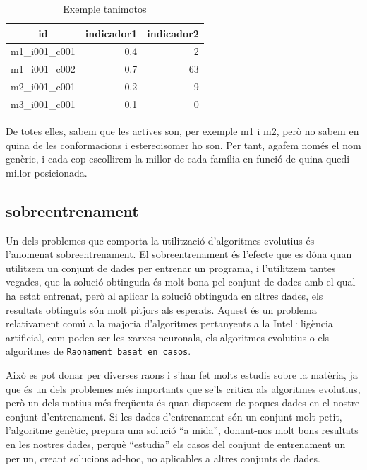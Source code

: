 \begin{table}
\centering
\begin{tabular}{|l|r|r|}
\hline
\multicolumn{1}{|c|}{\textbf{id }} & \multicolumn{1}{c|}{\textbf{ indicador1 }} & \multicolumn{1}{c|}{\textbf{ indicador2}} \\
\hline
\hline
m1\_i001\_c001 & 0.4 & 2  \\
m1\_i001\_c002 & 0.7 & 63 \\
m2\_i001\_c001 & 0.2 & 9  \\
m3\_i001\_c001 & 0.1 & 0  \\
\hline
\end{tabular}
\caption{Exemple tanimotos}
\end{table}

De totes elles, sabem que les actives son, per exemple m1 i m2, però no sabem
en quina de les conformacions i estereoisomer ho son.  Per tant, agafem només el
nom genèric, i cada cop escollirem la millor de cada família en funció de quina
quedi millor posicionada.



\subsection{sobreentrenament} %
\label{sub:sobreentrenament}

Un dels problemes que comporta la utilització d'algoritmes evolutius és
l'anomenat sobreentrenament.  El sobreentrenament és l'efecte que es dóna quan
utilitzem un conjunt de dades per entrenar un programa, i l'utilitzem tantes
vegades, que la solució obtinguda és molt bona pel conjunt de dades amb el qual
ha estat entrenat, però al aplicar la solució obtinguda en altres dades, els
resultats obtinguts són molt pitjors als esperats.  Aquest és un problema
relativament comú a la majoria d'algoritmes pertanyents a la Intel·ligència
artificial, com poden ser les xarxes neuronals, els algoritmes evolutius o els
algoritmes de \texttt{Raonament basat en casos}.

Això es pot donar per diverses raons i s'han fet molts estudis sobre la
matèria, ja que és un dels problemes més importants que se'ls critica als
algoritmes evolutius, però un dels motius més freqüents és quan
disposem de poques dades en el nostre conjunt d'entrenament.  Si les dades
d'entrenament són un conjunt molt petit, l'algoritme genètic, prepara una
solució ``a mida'', donant-nos molt bons resultats en les nostres dades, perquè
``estudia'' els casos del conjunt de entrenament un per un, creant solucions
ad-hoc, no aplicables a altres conjunts de dades.

